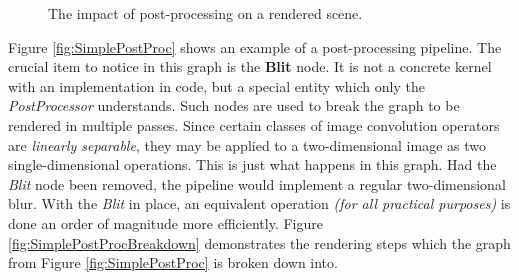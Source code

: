 \begin{figure}[h!]
  \centering
  \caption[The impact of post-processing]{The impact of post-processing on a rendered scene.}
\label{fig:lppFalloffBetterCase}
\end{figure}

Figure \ref{fig:SimplePostProc} shows an example of a post-processing pipeline. The crucial item to notice in this graph is the \textbf{Blit} node. It is not a concrete kernel with an implementation in code, but a special entity which only the \emph{PostProcessor} understands. Such nodes are used to break the graph to be rendered in multiple passes. Since certain classes of image convolution operators are \emph{linearly separable}, they may be applied to a two-dimensional image as two single-dimensional operations. This is just what happens in this graph. Had the \emph{Blit} node been removed, the pipeline would implement a regular two-dimensional blur. With the \emph{Blit} in place, an equivalent operation \emph{(for all practical purposes)} is done an order of magnitude more efficiently. Figure \ref{fig:SimplePostProcBreakdown} demonstrates the rendering steps which the graph from Figure \ref{fig:SimplePostProc} is broken down into.


